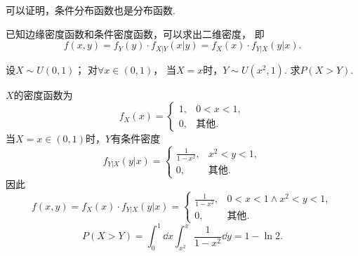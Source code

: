 可以证明，条件分布函数也是分布函数.

\begin{corollary}
已知边缘密度函数和条件密度函数，可以求出二维密度，
即\begin{equation*}
	f(x,y) = f_Y(y) \cdot f_{X \vert Y}(x \vert y)
	= f_X(x) \cdot f_{Y \vert X}(y \vert x).
\end{equation*}
\end{corollary}

\begin{example}
设\(X \sim U(0,1)\)；
对\(\forall x\in(0,1)\)，
当\(X=x\)时，\(Y \sim U(x^2,1)\).
求\(P(X > Y)\).
\begin{solution}
\(X\)的密度函数为\[
	f_X(x) = \left\{ \begin{array}{cl}
		1, & 0<x<1, \\
		0, & \text{其他}.
	\end{array} \right.
\]当\(X=x\in(0,1)\)时，\(Y\)有条件密度\[
	f_{Y \vert X}(y \vert x)
	= \left\{ \begin{array}{cl}
		\frac{1}{1-x^2}, & x^2<y<1, \\
		0, & \text{其他}.
	\end{array} \right.
\]因此\[
	f(x,y) = f_X(x) \cdot f_{Y \vert X}(y \vert x)
	= \left\{ \begin{array}{cl}
		\frac{1}{1-x^2}, & 0<x<1 \land x^2<y<1, \\
		0, & \text{其他}.
	\end{array} \right.
\]\[
	P(X > Y)
	= \int_0^1 \dd{x} \int_{x^2}^x \frac{1}{1-x^2} \dd{y}
	= 1 - \ln2.
\]
\end{solution}
\end{example}

